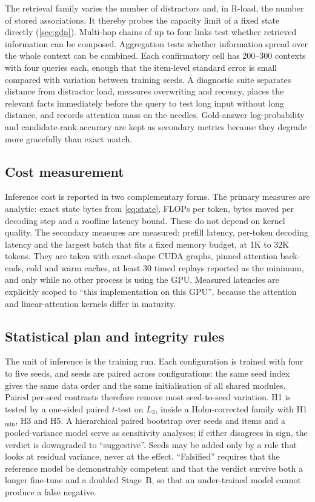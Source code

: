 \documentclass[10pt,a4paper]{article}
\begin{document}
The retrieval family varies the number of distractors and, in R-load, the number of stored
associations. It thereby probes the capacity limit of a fixed state directly (\cref{sec:gdn}).
Multi-hop chains of up to four links test whether retrieved information can be composed.
Aggregation tests whether information spread over the whole context can be combined. Each
confirmatory cell has 200--300 contexts with four queries each, enough that the
item-level standard error is small compared with variation between training seeds. A diagnostic
suite separates distance from distractor load, measures overwriting and recency, places the
relevant facts immediately before the query to test long input without long distance, and records
attention mass on the needles. Gold-answer log-probability and candidate-rank accuracy are kept as
secondary metrics because they degrade more gracefully than exact match.

\subsection{Cost measurement}
Inference cost is reported in two complementary forms. The primary measures are analytic: exact
state bytes from \cref{eq:state}, FLOPs per token, bytes moved per decoding step and a roofline
latency bound. These do not depend on kernel quality. The secondary measures are measured: prefill
latency, per-token decoding latency and the largest batch that fits a fixed memory budget, at 1K to
32K tokens. They are taken with exact-shape CUDA graphs, pinned attention back-ends, cold and warm
caches, at least 30 timed replays reported as the minimum, and only while no other process is using
the GPU. Measured latencies are explicitly scoped to ``this implementation on this GPU'', because
the attention and linear-attention kernels differ in maturity.

\subsection{Statistical plan and integrity rules}\label{sec:stats}
The unit of inference is the training run. Each configuration is trained with four to five seeds,
and seeds are paired across configurations: the same seed index gives the same data order and the
same initialisation of all shared modules. Paired per-seed contrasts therefore remove most
seed-to-seed variation. H1 is tested by a one-sided paired $t$-test on $L_3$, inside a Holm-corrected
family with H1$_{\min}$, H3 and H5. A hierarchical paired bootstrap over seeds and items and a
pooled-variance model serve as sensitivity analyses; if either disagrees in sign, the verdict is
downgraded to ``suggestive''. Seeds may be added only by a rule that looks at residual variance,
never at the effect. ``Falsified'' requires that the reference model be demonstrably competent and
that the verdict survive both a longer fine-tune and a doubled Stage~B, so that an under-trained
model cannot produce a false negative.
\end{document}
